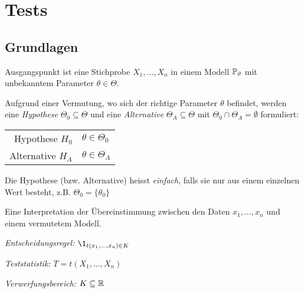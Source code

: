 


\section{Tests}

\subsection{Grundlagen}

Ausgangspunkt ist eine Stichprobe \(X_1,\ldots,X_n\) in einem Modell \(\P_\theta\) mit unbekanntem
Parameter \(\theta \in \Theta\).


\begin{definition}[Modellklassen]
	Aufgrund einer Vermutung, wo sich der richtige Parameter \(\theta\) befindet,
	werden eine \emph{Hypothese} \(\Theta_0 \subseteq \Theta\) und eine \emph{Alternative}
	\(\Theta_A \subseteq \Theta\) mit \(\Theta_0 \cap \Theta_A = \emptyset\) formuliert:

	\begin{center}
		\begin{tabular}{r@{ : }l}
			Hypothese \(H_0\)   & \(\theta \in \Theta_0\) \\
			Alternative \(H_A\) & \(\theta \in \Theta_A\)
		\end{tabular}
	\end{center}
\end{definition}

\begin{note}
	Die Hypothese (bzw. Alternative) heisst \emph{einfach},
	falls sie nur aus einem einzelnen Wert besteht, z.B. \(\Theta_0 = \{\theta_0\}\)
\end{note}

\begin{definition}[Test]
	Eine Interpretation der Übereinstimmung zwischen den Daten
	\(x_1, \ldots, x_n\) und einem vermutetem Modell.

	\begin{compactenum}
		\item \emph{Entscheidungsregel:} \(\1_{t(x_1,\ldots,x_n) \in K}\)
		\item \emph{Teststatistik:} \(T = t (X_1,\ldots,X_n)\)
		\item \emph{Verwerfungsbereich:} \(K \subseteq \R\)
	\end{compactenum}
\end{definition}

